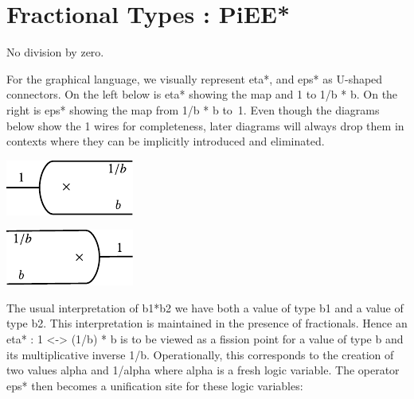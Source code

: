 \documentclass[preprint]{sigplanconf}
\begin{document}
\section{Fractional Types : {{PiEE*}} }

%

\noindent
No division by zero. 

\begin{multicols}{2}  

\end{multicols}

For the graphical language, we visually represent {{eta*}}, and
{{eps*}} as U-shaped connectors. On the left below is {{eta*}} showing
the map and {{1}} to {{1/b * b}}.  On the right is {{eps*}} showing
the map from {{1/b * b}} to~1. Even though the diagrams below show the
{{1}} wires for completeness, later diagrams will always drop them in
contexts where they can be implicitly introduced and eliminated.
\begin{multicols}{2}
\begin{center}
  \includegraphics{diagrams/eta_times.pdf}
\end{center}
  
\begin{center}
  \includegraphics{diagrams/eps_times.pdf}
\end{center}
\end{multicols}

The usual interpretation of {{b1*b2}} we have both a value of type
{{b1}} and a value of type {{b2}}. This interpretation is maintained
in the presence of fractionals. Hence an {{eta* : 1 <-> (1/b) * b}} is
to be viewed as a fission point for a value of type {{b}} and its
multiplicative inverse {{1/b}}. Operationally, this corresponds to the
creation of two values {{alpha}} and {{1/alpha}} where {{alpha}} is a
fresh logic variable. The operator {{eps*}} then becomes a unification
site for these logic variables:
\end{document}
